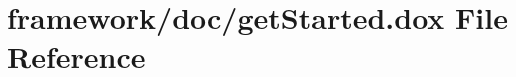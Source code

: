 \hypertarget{get_started_8dox}{}\section{framework/doc/get\+Started.dox File Reference}
\label{get_started_8dox}
